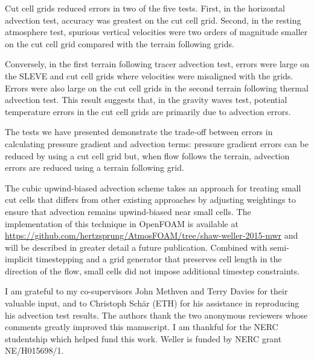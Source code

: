 \documentclass{ametsoc}
\begin{document}
Cut cell grids reduced errors in two of the five tests.  First, in the horizontal advection test, accuracy was greatest on the cut cell grid.  Second, in the resting atmosphere test, spurious vertical velocities were two orders of magnitude smaller on the cut cell grid compared with the terrain following grids.

Conversely, in the first terrain following tracer advection test, errors were large on the SLEVE and cut cell grids where velocities were misaligned with the grids.  Errors were also large on the cut cell grids in the second terrain following thermal advection test.  This result suggests that, in the gravity waves test, potential temperature errors in the cut cell grids are primarily due to advection errors.

The tests we have presented demonstrate the trade-off between errors in calculating pressure gradient and advection terms: pressure gradient errors can be reduced by using a cut cell grid but, when flow follows the terrain, advection errors are reduced using a terrain following grid.

The cubic upwind-biased advection scheme takes an approach for treating small cut cells that differs from other existing approaches by adjusting weightings to ensure that advection remains upwind-biased near small cells.  The implementation of this technique in OpenFOAM is available at \url{https://github.com/hertzsprung/AtmosFOAM/tree/shaw-weller-2015-mwr} and will be described in greater detail a future publication.  Combined with semi-implicit timestepping and a grid generator that preserves cell length in the direction of the flow, small cells did not impose additional timestep constraints.

\acknowledgments
I am grateful to my co-supervisors John Methven and Terry Davies for their valuable input, and to Christoph Sch\"{a}r (ETH) for his assistance in reproducing his advection test results.  The authors thank the two anonymous reviewers whose comments greatly improved this manuscript.  I am thankful for the NERC studentship which helped fund this work.  Weller is funded by NERC grant NE/H015698/1.

\begin{appendices}

\end{appendices}






\end{document}
